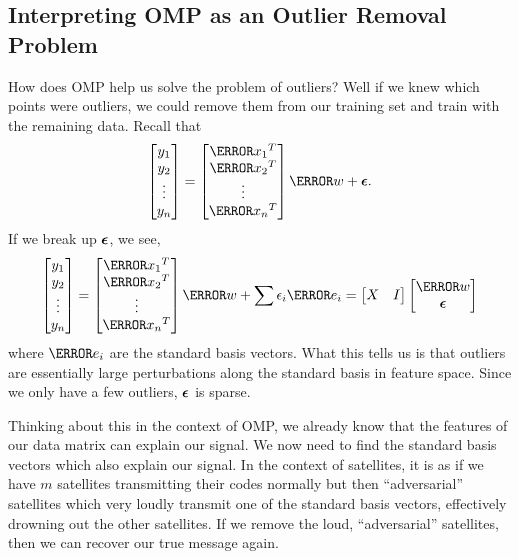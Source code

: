   \subsection{Interpreting OMP as an Outlier Removal Problem}
  How does OMP help us solve the problem of outliers? Well if we knew which points were outliers, we could remove them from our training set and train with the remaining data.
  Recall that
  \[
	\begin{bmatrix}
	  y_1\\y_2\\\vdots\\y_n
	\end{bmatrix} = \begin{bmatrix}
	  \V{x_1}^T\\\V{x_2}^T\\\vdots\\\V{x_n}^T
	\end{bmatrix}\V{w} + \bs{\epsilon}.
  \]
  If we break up $\boldsymbol{\epsilon}$, we see,
  \[
	\begin{bmatrix}
	  y_1\\y_2\\\vdots\\y_n
	\end{bmatrix} = \begin{bmatrix}
	  \V{x_1}^T\\\V{x_2}^T\\\vdots\\\V{x_n}^T
	\end{bmatrix}\V{w} + \sum \epsilon_i \V{e_i} = 
	\begin{bmatrix}
	  X & I
	\end{bmatrix} \begin{bmatrix}
	  \V{w}\\ \bs{\epsilon}
	\end{bmatrix}
  \]
  where $\V{e_i}$ are the standard basis vectors.
  What this tells us is that outliers are essentially large perturbations along the standard basis in feature space.
  Since we only have a few outliers, $\boldsymbol{\epsilon}$ is sparse. 

  Thinking about this in the context of OMP, we already know that the features of our data matrix can explain our signal.
  We now need to find the standard basis vectors which also explain our signal.
  In the context of satellites, it is as if we have $m$ satellites transmitting their codes normally but then ``adversarial'' satellites which very loudly transmit one of the standard basis vectors, effectively drowning out the other satellites.
  If we remove the loud, ``adversarial'' satellites, then we can recover our true message again.

